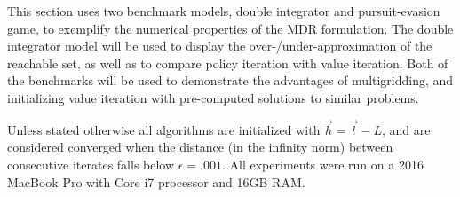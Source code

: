 This section uses two benchmark models, double integrator and pursuit-evasion game, to exemplify the numerical properties of the MDR formulation. The double integrator model will be used to display the over-/under-approximation of the reachable set, as well as to compare policy iteration with value iteration. Both of the benchmarks will be used to demonstrate the advantages of multigridding, and initializing value iteration with pre-computed solutions to similar problems. 

Unless stated otherwise all algorithms are initialized with $\vec{h}=\vec{l}-L$, and are considered converged when the distance (in the infinity norm) between consecutive iterates falls below $\epsilon =.001$. All experiments were run on a 2016 MacBook Pro with Core i7 processor and 16GB RAM.




